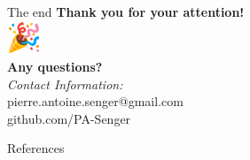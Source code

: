 \documentclass[10pt]{beamer}
\begin{document}
\begin{frame}{The end}
  \Large
  \centering
  \textbf{Thank you for your attention!} \\
  \vspace{1em}
  \includegraphics[height=1cm]{images/party-emoji.png} \\
  \vspace{1em}
  \textbf{Any questions?} \\
  \vspace{2em}
  \small
  \textit{Contact Information:} \\
  pierre.antoine.senger@gmail.com \\
  github.com/PA-Senger
\end{frame}

\begin{frame}{References}
  \printbibliography
\end{frame}
\end{document}
